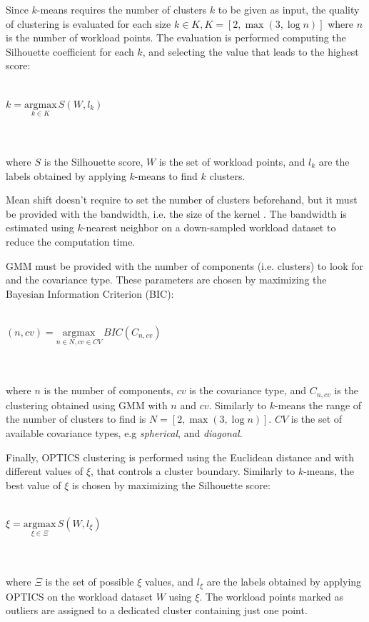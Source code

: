 \documentclass[a4paper, 12pt]{article} %
\begin{document}
	Since $k$-means requires the number of clusters $k$ to be given as input, the quality of clustering is evaluated for each size $k \in K, K = [2, \max (3, \log n)]$ where $n$ is the number of workload points. The evaluation is performed computing the Silhouette coefficient \cite{SilhouetteCoefficient} for each $k$, and selecting the value that leads to the highest score:\\\\
	\centerline{
	$
		k = \underset{k \in K}{\mathrm{argmax}}\, S(W, l_k)
	$
	}\\\\
	where $S$ is the Silhouette score, $W$ is the set of workload points, and $l_k$ are the labels obtained by applying $k$-means to find $k$ clusters.
	
	Mean shift doesn't require to set the number of clusters beforehand, but it must be provided with the bandwidth,  i.e. the size of the kernel \cite{MeanShift}. The bandwidth is estimated using $k$-nearest neighbor on a down-sampled workload dataset to reduce the computation time.
	
	GMM must be provided with the number of components (i.e. clusters) to look for and the covariance type. These parameters are chosen by maximizing the Bayesian Information Criterion (BIC):\\\\
	\centerline{
		$
		(n, cv) = \underset{n \in N, cv \in CV}{\mathrm{argmax}}\, BIC(C_{n, cv})
		$
	}\\\\
	where $n$ is the number of components, $cv$ is the covariance type, and $C_{n, cv}$ is the clustering obtained using GMM with $n$ and $cv$. Similarly to $k$-means the range of the number of clusters to find is $N = [2, \max (3, \log n)]$. $CV$ is the set of available covariance types, e.g \textit{spherical}, and \textit{diagonal}.
	
	Finally, OPTICS clustering is performed using the Euclidean distance and with different values of $\xi$, that controls a cluster boundary. Similarly to $k$-means, the best value of $\xi$ is chosen by maximizing the Silhouette score: \\\\
	\centerline{
		$
		\xi = \underset{\xi \in \Xi}{\mathrm{argmax}}\, S(W, l_\xi)
		$
	}\\\\
	where $\Xi$ is the set of possible $\xi$ values, and $l_\xi$ are the labels obtained by applying OPTICS on the workload dataset $W$ using $\xi$. The workload points marked as outliers are assigned to a dedicated cluster containing just one point.
	
\end{document}
